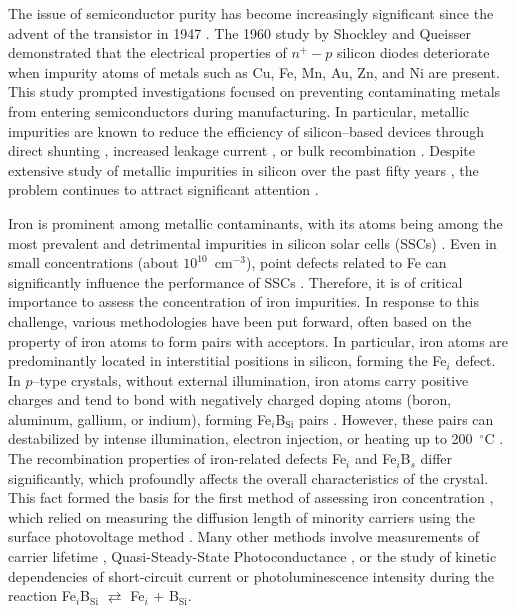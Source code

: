 \documentclass[a4paper,fleqn]{cas-sc}
\begin{document}
The issue of semiconductor purity has become increasingly significant since the advent of the transistor in 1947 \cite{Claers2018}.
The 1960 study by Shockley and Queisser \cite{Goetzberger1960} demonstrated that
the electrical properties of $n^{+}-p$ silicon diodes deteriorate when impurity atoms of metals such as Cu, Fe, Mn, Au, Zn, and Ni are present.
This study prompted investigations focused on preventing contaminating metals from entering semiconductors during manufacturing.
In particular, metallic impurities are known to reduce the efficiency of
silicon--based devices through direct shunting \cite{Rsh:Breitenstein},
increased leakage current \cite{Lee1980},
or bulk recombination \cite{Istratov2000}.
Despite extensive study of metallic impurities in silicon over the past fifty years \cite{Claers2018,Pearce1977},
the problem continues to attract significant attention \cite{Hajjiah2020,Le2024,Maoudj2021,OlikhPSSA,LaineIEEEPV2016}.


Iron is prominent among metallic contaminants, with its atoms being among
the most prevalent and detrimental impurities in silicon solar cells (SSCs) \cite{Buonassisi2006}.
Even in small concentrations (about $10^{10}$~cm$^{-3}$),
point defects related to Fe can significantly influence the performance of SSCs \cite{IronSC,Herguth2022}.
Therefore, it is of critical importance to assess the concentration of iron impurities.
In response to this challenge, various methodologies have been put forward,
often based on the property of iron atoms to form pairs with acceptors.
In particular, iron atoms are predominantly located in interstitial positions in silicon, forming the Fe$_i$ defect.
In $p$--type crystals, without external illumination, iron atoms carry positive charges and tend to bond with negatively charged doping atoms
(boron, aluminum, gallium, or indium), forming Fe$_i$B$_\mathrm{Si}$ pairs \cite{Kimerling1983}.
However, these pairs can destabilized by intense illumination, electron injection, or heating up to 200~$^\circ$C \cite{FeBAssJAP2014}.
The recombination properties of iron-related defects Fe$_i$ and Fe$_i$B$_s$ differ significantly,
which profoundly affects the overall characteristics of the crystal.
This fact formed the basis for the first method of assessing iron concentration \cite{Zoth1990},
which relied on measuring the diffusion length of minority carriers using the surface photovoltage method \cite{Tousek2008}.
Many other methods involve measurements of carrier lifetime \cite{Rein2,Schmidt2005},
Quasi-Steady-State Photoconductance \cite{Goodarzi2017},
or the study of kinetic dependencies of short-circuit current \cite{Olikh2021JAP}
or photoluminescence intensity \cite{FeMethod2012} during the reaction Fe$_i$B$_\mathrm{Si}$ $\rightleftarrows$ Fe$_i$ + B$_\mathrm{Si}$.
\end{document}
